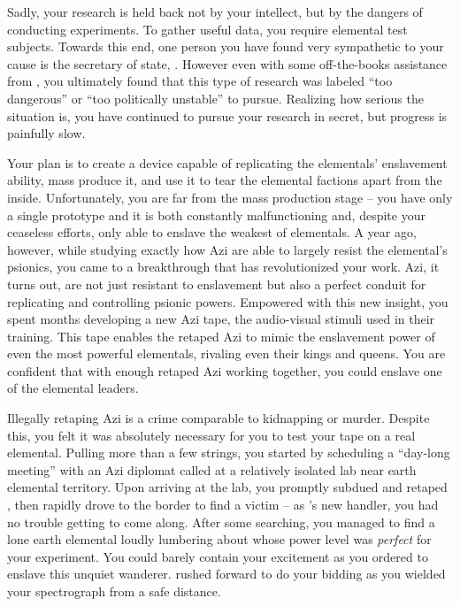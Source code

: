 \documentclass[char]{elementals}
\begin{document}
Sadly, your research is held back not by your intellect, but by the dangers of conducting experiments. To gather useful data, you require elemental test subjects. Towards this end, one person you have found very sympathetic to your cause is the secretary of state, \cDema{\intro}. However even with some off-the-books assistance from \cDema{}, you ultimately found that this type of research was labeled ``too dangerous'' or ``too politically unstable'' to pursue. Realizing how serious the situation is, you have continued to pursue your research in secret, but progress is painfully slow.

Your plan is to create a device capable of replicating the elementals' enslavement ability, mass produce it, and use it to tear the elemental factions apart from the inside. Unfortunately, you are far from the mass production stage -- you have only a single prototype and it is both constantly malfunctioning and, despite your ceaseless efforts, only able to enslave the weakest of elementals. A year ago, however, while studying exactly how Azi are able to largely resist the elemental's psionics, you came to a breakthrough that has revolutionized your work. Azi, it turns out, are not just resistant to enslavement but also a perfect conduit for replicating and controlling psionic powers. Empowered with this new insight, you spent months developing a new Azi tape, the audio-visual stimuli used in their training. This tape enables the retaped Azi to mimic the enslavement power of even the most powerful elementals, rivaling even their kings and queens. You are confident that with enough retaped Azi working together, you could enslave one of the elemental leaders.

Illegally retaping Azi is a crime comparable to kidnapping or murder. Despite this, you felt it was absolutely necessary for you to test your tape on a real elemental. Pulling more than a few strings, you started by scheduling a ``day-long meeting'' with an Azi diplomat called \cDiplomat{\intro} at a relatively isolated lab near earth elemental territory. Upon arriving at the lab, you promptly subdued and retaped \cDiplomat{}, then rapidly drove to the border to find a victim -- as \cDiplomat{}'s new handler, you had no trouble getting \cDiplomat{\them} to come along. After some searching, you managed to find a lone earth elemental loudly lumbering about whose power level was \emph{perfect} for your experiment. You could barely contain your excitement as you ordered \cDiplomat{} to enslave this unquiet wanderer. \cDiplomat{} rushed forward to do your bidding as you wielded your spectrograph from a safe distance.
\end{document}
